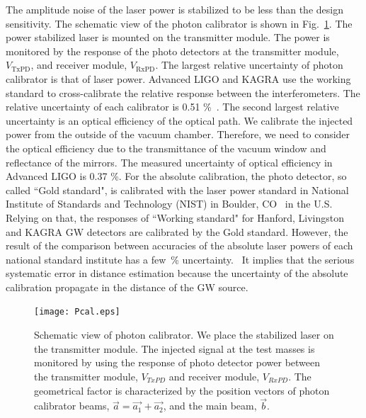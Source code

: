 \documentclass[%
 reprint,
superscriptaddress,
 amsmath,amssymb,
 aps,
]{revtex4-1}
\begin{document}
The amplitude noise of the laser power is stabilized to be less than the design sensitivity. The schematic view of the photon calibrator is shown in Fig.~\ref{fig:Pcal}. The power stabilized laser is mounted on the transmitter module. The power is monitored by the response of the photo detectors at the transmitter module, $V_{\mathrm{TxPD}}$, and receiver module, $V_{\mathrm{RxPD}}$.  
The largest relative %
uncertainty of photon calibrator is that of laser power.
Advanced LIGO and KAGRA use the working standard to cross-calibrate the relative response between the interferometers. The relative uncertainty of each calibrator is 0.51 \%~\cite{doi:10.1063/1.4967303}. 
The second largest relative uncertainty is an optical efficiency of the optical path. We calibrate the injected power from the outside of the vacuum chamber. Therefore, we need to consider the optical efficiency due to the transmittance of the vacuum window and reflectance of the mirrors. The measured uncertainty of optical efficiency in Advanced LIGO is 0.37 \%. 
For the absolute calibration, the photo detector, so called ``Gold standard", is calibrated with the laser power standard in National Institute of Standards and Technology (NIST) in Boulder, CO~\cite{taylor:1994:GEEU} in the U.S. 
Relying on that, the responses of ``Working standard" for Hanford, Livingston and KAGRA GW detectors are calibrated by the Gold standard. 
However, the result of the comparison between accuracies of the absolute laser powers of each national standard institute has a few~\% 
uncertainty.~\cite{EUROMET} %
 It implies that the serious systematic error in distance estimation because the uncertainty of the absolute calibration propagate in the distance of the GW source.

\begin{figure}
\begin{center}
\texttt{[image: Pcal.eps]}
\caption{Schematic view of photon calibrator. We place the stabilized laser on the transmitter module. The injected signal at the test masses is monitored by using the response of photo detector power between the transmitter module, $V_{TxPD}$ and  receiver module, $V_{RxPD}$.  The geometrical factor is characterized by the position vectors of photon calibrator beams, $\vec{a}=\vec{a_1}+\vec{a_2}$, and the main beam, $\vec{b}$.}
\label{fig:Pcal}
\end{center}
\end{figure}
\end{document}
